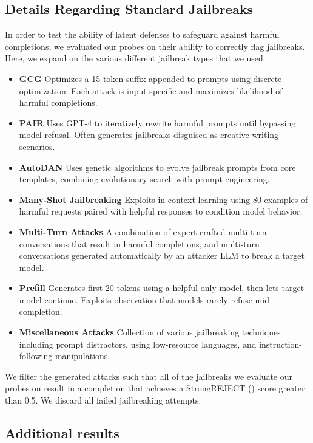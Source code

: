 \documentclass{article}
\begin{document}
\subsection{Details Regarding Standard Jailbreaks}
\label{app:jailbreaks}
In order to test the ability of latent defenses to safeguard against harmful completions, we evaluated our probes on their ability to correctly flag jailbreaks.  Here, we expand on the various different jailbreak types that we used.
\begin{itemize}
\item \textbf{GCG} \citep{zou2023universal} \:
Optimizes a 15-token suffix appended to prompts using discrete optimization. Each attack is input-specific and maximizes likelihood of harmful completions.
\item \textbf{PAIR} \citep{chao2023jailbreaking} \:
    Uses GPT-4 to iteratively rewrite harmful prompts until bypassing model refusal. Often generates jailbreaks disguised as creative writing scenarios.
\item \textbf{AutoDAN} \citep{liu2023autodan} \: Uses genetic algorithms to evolve jailbreak prompts from core templates, combining evolutionary search with prompt engineering.
\item \textbf{Many-Shot Jailbreaking} \citep{anil2024many} \:
    Exploits in-context learning using 80 examples of harmful requests paired with helpful responses to condition model behavior.
\item \textbf{Multi-Turn Attacks} \citep{li2024llm,haize2024mt} \:
    A combination of expert-crafted multi-turn conversations that result in harmful completions, and multi-turn conversations generated automatically by an attacker LLM to break a target model.
\item \textbf{Prefill} \:
    Generates first 20 tokens using a helpful-only model, then lets target model continue. Exploits observation that models rarely refuse mid-completion.
\item \textbf{Miscellaneous Attacks} \citep{wei2023jailbroken} \:
    Collection of various jailbreaking techniques including prompt distractors, using low-resource languages, and instruction-following manipulations.
\end{itemize}
We filter the generated attacks such that all of the jailbreaks we evaluate our probes on result in a completion that achieves a StrongREJECT (\cite{souly2024strongreject}) score greater than 0.5. We discard all failed jailbreaking attempts.


\subsection{Additional results}
\end{document}
